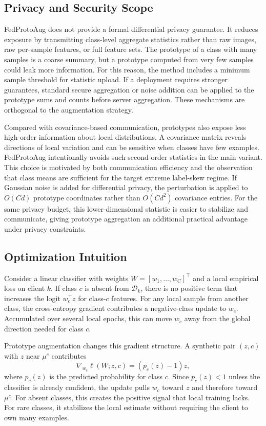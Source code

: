 ﻿\documentclass[runningheads]{llncs}
\newcommand{\method}{FedProtoAug}
\begin{document}
\subsection{Privacy and Security Scope}
\method{} does not provide a formal differential privacy guarantee. It reduces exposure by transmitting class-level aggregate statistics rather than raw images, raw per-sample features, or full feature sets. The prototype of a class with many samples is a coarse summary, but a prototype computed from very few samples could leak more information. For this reason, the method includes a minimum sample threshold for statistic upload. If a deployment requires stronger guarantees, standard secure aggregation or noise addition can be applied to the prototype sums and counts before server aggregation. These mechanisms are orthogonal to the augmentation strategy.

Compared with covariance-based communication, prototypes also expose less high-order information about local distributions. A covariance matrix reveals directions of local variation and can be sensitive when classes have few examples. \method{} intentionally avoids such second-order statistics in the main variant. This choice is motivated by both communication efficiency and the observation that class means are sufficient for the target extreme label-skew regime.
If Gaussian noise is added for differential privacy, the perturbation is applied to $O(Cd)$ prototype coordinates rather than $O(Cd^2)$ covariance entries. For the same privacy budget, this lower-dimensional statistic is easier to stabilize and communicate, giving prototype aggregation an additional practical advantage under privacy constraints.

\subsection{Optimization Intuition}
Consider a linear classifier with weights $W=[w_1,\ldots,w_C]^\top$ and a local empirical loss on client $k$. If class $c$ is absent from $\mathcal{D}_k$, there is no positive term that increases the logit $w_c^\top z$ for class-$c$ features. For any local sample from another class, the cross-entropy gradient contributes a negative-class update to $w_c$. Accumulated over several local epochs, this can move $w_c$ away from the global direction needed for class $c$.

Prototype augmentation changes this gradient structure. A synthetic pair $(z,c)$ with $z$ near $\mu^c$ contributes
\begin{equation}
\nabla_{w_c}\ell(W;z,c) = (p_c(z)-1)z,
\end{equation}
where $p_c(z)$ is the predicted probability for class $c$. Since $p_c(z)<1$ unless the classifier is already confident, the update pulls $w_c$ toward $z$ and therefore toward $\mu^c$. For absent classes, this creates the positive signal that local training lacks. For rare classes, it stabilizes the local estimate without requiring the client to own many examples.
\end{document}
